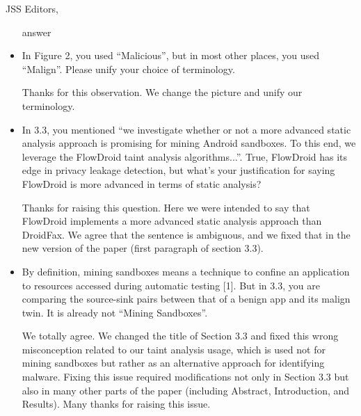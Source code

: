 \documentclass{letter}
\begin{document}
\begin{letter}{JSS Editors,}
\begin{itemize}
\vspace{0.2cm}

{\color{blue}{\bf Answer.} answer}

\vspace{0.2cm}

\item In Figure 2, you used ``Malicious'', but in most other places, you used ``Malign''. Please unify your choice of terminology.


\vspace{0.2cm}

{\color{blue}{\bf Answer.} Thanks for this observation. We change the picture and unify our terminology.}

\vspace{0.2cm}

\item In 3.3, you mentioned ``we investigate whether or not a more advanced static analysis approach is promising for mining 
Android sandboxes. To this end, we leverage the FlowDroid taint analysis algorithms...''. True, FlowDroid has its edge 
in privacy leakage detection, but what's your justification for saying FlowDroid is more advanced in terms of static analysis?


\vspace{0.2cm}

{\color{blue}{\bf Answer.} Thanks for raising this question. Here we were intended to say that FlowDroid implements a more advanced static analysis approach than DroidFax. We agree that the sentence is ambiguous, and we fixed that in the new version of the paper (first paragraph
  of section 3.3).}

\vspace{0.2cm}

\item By definition, mining sandboxes means a technique to confine an application to resources accessed during automatic 
testing [1]. But in 3.3, you are comparing the source-sink pairs between that of a benign app and its malign twin. It is already 
not ``Mining Sandboxes''.

\vspace{0.2cm}

{\color{blue}{\bf Answer.} We totally agree. We changed the title of Section 3.3 and fixed this wrong misconception related to our taint analysis usage, which is used not for mining sandboxes but rather as an alternative approach for identifying malware. Fixing this issue required modifications not only in Section 3.3 but also in many other parts of the paper (including Abstract, Introduction, and Results). Many thanks for raising this issue.}



\end{itemize}
\end{letter}
\end{document}
